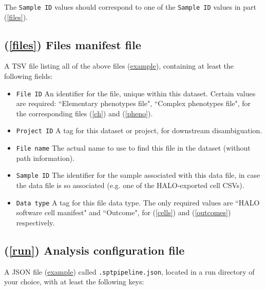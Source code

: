 \documentclass[14pt]{article}
\begin{document}
The \colorbox{yellow!25}{\texttt{Sample ID}} values should correspond to one of the \colorbox{yellow!25}{\texttt{Sample ID}} values in part (\ref{files}).

\subsection*{(\ref{files}) Files manifest file} A TSV file listing all of the above files (\href{https://github.com/nadeemlab/SPT/blob/main/tests/data/file_manifest.tsv}{example}), containing at least the following fields:

\begin{itemize}
  \itemsep0em
  \item[]{\colorbox{yellow!25}{\texttt{File ID}} \hspace{0.5pc} An identifier for the file, unique within this dataset. Certain values are required: ``Elementary phenotypes file", ``Complex phenotypes file", for the corresponding files (\ref{ch}) and (\ref{pheno}).}
  \item[]{\colorbox{yellow!25}{\texttt{Project ID}} \hspace{0.5pc} A tag for this dataset or project, for downstream disambiguation.}
  \item[]{\colorbox{yellow!25}{\texttt{File name}} \hspace{0.5pc} The actual name to use to find this file in the dataset (without path information).}
  \item[]{\colorbox{yellow!25}{\texttt{Sample ID}} \hspace{0.5pc} The identifier for the sample associated with this data file, in case the data file is so associated (e.g. one of the HALO-exported cell CSVs).}
  \item[]{\colorbox{yellow!25}{\texttt{Data type}} \hspace{0.5pc} A tag for this file data type. The only required values are ``HALO software cell manifest" and ``Outcome", for (\ref{cells}) and (\ref{outcomes}) respectively.}
\end{itemize}

\subsection*{(\ref{run}) Analysis configuration file}
A JSON file (\href{https://github.com/nadeemlab/SPT/blob/main/tests/integration_tests/example_config_files/density.json}{example}) called \colorbox{gray!20}{\texttt{.spt{\textunderscore}pipeline.json}}, located in a run directory of your choice, with at least the following keys:
\end{document}
